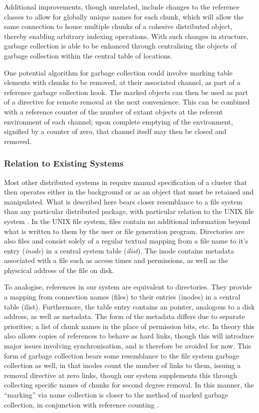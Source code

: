 Additional improvements, though unrelated, include changes to the
reference classes to allow for globally unique names for each chunk,
which will allow the same connection to house multiple chunks of a
cohesive distributed object, thereby enabling arbitrary indexing
operations. With such changes in structure, garbage collection is able
to be enhanced through centralising the objects of garbage collection
within the central table of locations.

One potential algorithm for garbage collection could involve marking
table elements with chunks to be removed, at their associated channel,
as part of a reference garbage collection hook. The marked objects can
then be used as part of a directive for remote removal at the next
convenience. This can be combined with a reference counter of the number
of extant objects at the referent environment of each channel; upon
complete emptying of the environment, signified by a counter of zero,
that channel itself may then be closed and removed.

\subsubsection{Relation to Existing Systems}\label{sec:localrel}

Most other distributed systems in \R{} require manual specification of a
cluster that then operates either in the background or as an object that
must be retained and manipulated. What is described here bears closer
resemblance to a file system than any particular distributed \R{} package,
with particular relation to the UNIX file system
\cites{ritchie1979evolution,thompson1974unix}. In the UNIX
file system, files contain no additional information beyond what is
written to them by the user or file generation program. Directories are
also files and consist solely of a regular textual mapping from a file
name to it's entry (\emph{inode}) in a central system table
(\emph{ilist}). The inode contains metadata associated with a file such
as access times and permissions, as well as the physcical address of the
file on disk.

To analogise, references in our system are equivalent to directories.
They provide a mapping from connection names (files) to their entries
(inodes) in a central table (ilist). Furthermore, the table entry
contains an  pointer, analogous to a disk address, as
well as metadata. The form of the metadata differs due to separate
priorities; a list of chunk names in the place of permission bits, etc.
In theory this also allows copies of references to behave as hard links,
though this will introduce major issues involving synchronisation, and
is therefore be avoided for now. This form of garbage collection bears
some resemblance to the file system garbage collection as well, in that
inodes count the number of links to them, issuing a removal directive at
zero links, though our system supplements this through collecting
specific names of chunks for second degree removal. In this manner, the
``marking'' via name collection is closer to the method of marked
garbage collection, in conjunction with reference counting
\cite{knuth1}.

